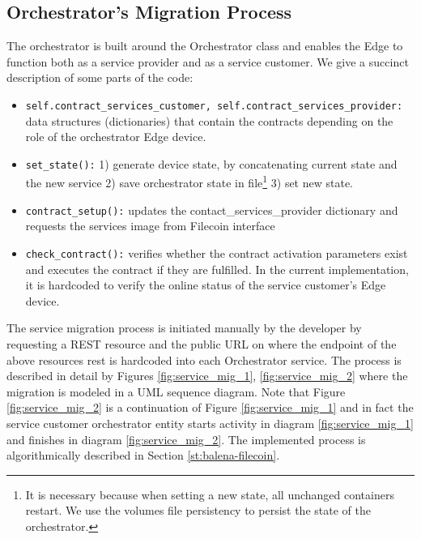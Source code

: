 \subsection{Orchestrator's Migration Process}

The orchestrator is built around the Orchestrator class and enables the Edge to function both as a service provider and as a service customer. We give a succinct description of some parts of the code:
\begin{itemize}
    \item \texttt{self.contract\_services\_customer, self.contract\_services\_provider:} data structures (dictionaries) that contain the contracts depending on the role of the orchestrator Edge device.
    \item \texttt{set\_state():} 1) generate device state, by concatenating current state and the new service 2) save orchestrator state in file\footnote{It is necessary because when setting a new state, all unchanged containers restart. We use the volumes file persistency to persist the state of the orchestrator.} 3) set new state.
    \item \texttt{contract\_setup():} updates the contact\_services\_provider dictionary and requests the services image from Filecoin interface
    \item \texttt{check\_contract():} verifies whether the contract activation parameters exist and executes the contract if they are fulfilled. In the current implementation, it is hardcoded to verify the online status of the service customer’s Edge device.
\end{itemize}

The service migration process is initiated manually by the developer by requesting a REST resource and the public URL on where the endpoint of the above resources rest is hardcoded into each Orchestrator service. The process is described in detail by Figures \ref{fig:service_mig_1}, \ref{fig:service_mig_2} where the migration is modeled in a UML sequence diagram. Note that Figure \ref{fig:service_mig_2} is a continuation of Figure \ref{fig:service_mig_1} and in fact the service customer orchestrator entity starts activity in diagram \ref{fig:service_mig_1} and finishes in diagram \ref{fig:service_mig_2}. The implemented process is algorithmically described in Section \ref{st:balena-filecoin}.

